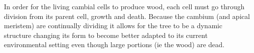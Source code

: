 In order for the living cambial cells to produce wood, each cell must go through
division from its parent cell, growth and death. Because the cambium (and apical
meristem) are continually dividing it allows for the tree to be a dynamic
structure changing its form to become better adapted to its current
environmental setting even though large portions (ie the wood) are dead. 